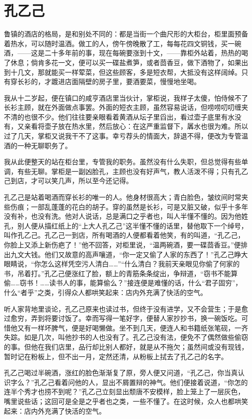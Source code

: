 \documentclass[showbib, lang=zh]{DeanReport}
\begin{document}
\section{孔乙己}
鲁镇的酒店的格局，是和别处不同的：都是当街一个曲尺形的大柜台，柜里面预备着热水，可以随时温酒。做工的人，傍午傍晚散了工，每每花四文铜钱，买一碗酒，——这是二十多年前的事，现在每碗要涨到十文，——靠柜外站着，热热的喝了休息；倘肯多花一文，便可以买一碟盐煮笋，或者茴香豆，做下酒物了，如果出到十几文，那就能买一样荤菜，但这些顾客，多是短衣帮，大抵没有这样阔绰。只有穿长衫的，才踱进店面隔壁的房子里，要酒要菜，慢慢地坐喝。

我从十二岁起，便在镇口的咸亨酒店里当伙计，掌柜说，我样子太傻，怕侍候不了长衫主顾，就在外面做点事罢。外面的短衣主顾，虽然容易说话，但唠唠叨叨缠夹不清的也很不少。他们往往要亲眼看着黄酒从坛子里舀出，看过壶子底里有水没有，又亲看将壶子放在热水里，然后放心：在这严重监督下，羼水也很为难。所以过了几天，掌柜又说我干不了这事。幸亏荐头的情面大，辞退不得，便改为专管温酒的一种无聊职务了。

我从此便整天的站在柜台里，专管我的职务。虽然没有什么失职，但总觉得有些单调，有些无聊。掌柜是一副凶脸孔，主顾也没有好声气，教人活泼不得；只有孔乙己到店，才可以笑几声，所以至今还记得。

孔乙己是站着喝酒而穿长衫的唯一的人。他身材很高大；青白脸色，皱纹间时常夹些伤痕；一部乱蓬蓬的花白的胡子。穿的虽然是长衫，可是又脏又破，似乎十多年没有补，也没有洗。他对人说话，总是满口之乎者也，叫人半懂不懂的。因为他姓孔，别人便从描红纸上的“上大人孔乙己”这半懂不懂的话里，替他取下一个绰号，叫作孔乙己。孔乙己一到店，所有喝酒的人便都看着他笑，有的叫道，“孔乙己，你脸上又添上新伤疤了！”他不回答，对柜里说，“温两碗酒，要一碟茴香豆。”便排出九文大钱。他们又故意的高声嚷道，“你一定又偷了人家的东西了！”孔乙己睁大眼睛说，“你怎么这样凭空污人清白……”“什么清白？我前天亲眼见你偷了何家的书，吊着打。”孔乙己便涨红了脸，额上的青筋条条绽出，争辩道，“窃书不能算偷……窃书！……读书人的事，能算偷么？”接连便是难懂的话，什么“君子固穷”，什么“者乎”之类，引得众人都哄笑起来：店内外充满了快活的空气。

听人家背地里谈论，孔乙己原来也读过书，但终于没有进学，又不会营生；于是愈过愈穷，弄到将要讨饭了。幸而写得一笔好字，便替人家抄抄书，换一碗饭吃。可惜他又有一样坏脾气，便是好喝懒做。坐不到几天，便连人和书籍纸张笔砚，一齐失踪。如是几次，叫他抄书的人也没有了。孔乙己没有法，便免不了偶然做些偷窃的事。但他在我们店里，品行却比别人都好，就是从不拖欠；虽然间或没有现钱，暂时记在粉板上，但不出一月，定然还清，从粉板上拭去了孔乙己的名字。

孔乙己喝过半碗酒，涨红的脸色渐渐复了原，旁人便又问道，“孔乙己，你当真认识字么？”孔乙己看着问他的人，显出不屑置辩的神气。他们便接着说道，“你怎的连半个秀才也捞不到呢？”孔乙己立刻显出颓唐不安模样，脸上笼上了一层灰色，嘴里说些话；这回可是全是之乎者也之类，一些不懂了。在这时候，众人也都哄笑起来：店内外充满了快活的空气。
\end{document}
